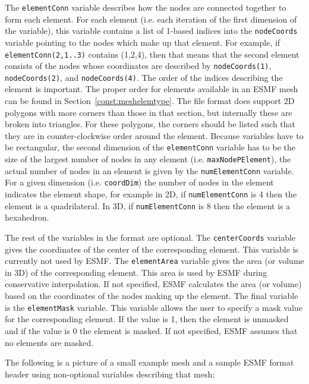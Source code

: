  The {\tt elementConn} variable describes how the nodes are connected together to form each element. For each element (i.e. each iteration of the first
 dimension of the variable), this variable contains a list of 1-based indices into the {\tt nodeCoords} variable pointing to the nodes which make up that
 element. For example, if {\tt elementConn(2,1..3)} contains (1,2,4), then that means that the second element consists of the nodes whose coordinates are
 described by {\tt nodeCoords(1)}, {\tt nodeCoords(2)}, and {\tt nodeCoords(4)}. The order of the indices describing the element is important.
 The proper order for elements available in an ESMF mesh can be found in Section~\ref{const:meshelemtype}. The file format does support 2D polygons with more
 corners than those in that section, but internally these are broken into triangles. For these polygons, the corners should
 be listed such that they are in counter-clockwise order around the element.  Because variables have to be rectangular, the second
 dimension of the {\tt elementConn} variable has to be the size of the largest number of nodes in any element (i.e. {\tt maxNodePElement}), the actual number of
 nodes in an element is given by the {\tt numElementConn} variable. For a given dimension (i.e. {\tt coordDim}) the number of nodes in the element
 indicates the element shape, for example in 2D, if {\tt numElementConn} is 4 then the element is a quadrilateral. In 3D, if {\tt numElementConn} is 8
 then the element is a hexahedron.

 The rest of the variables in the format are optional. The {\tt centerCoords} variable gives the coordinates of the center of the corresponding element.
 This variable is currently not used by ESMF. The {\tt elementArea} variable gives the area (or volume in 3D) of the corresponding element. This
 area is used by ESMF during conservative interpolation. If not specified, ESMF calculates the area (or volume) based on the coordinates of the nodes
 making up the element. The final variable is the {\tt elementMask} variable. This variable allows the user to specify a mask value for
 the corresponding element. If the value is 1, then the element is unmasked and if the value is 0 the element is masked.
 If not specified, ESMF assumes that no elements are masked.

The following is a picture of a small example mesh and a sample ESMF format header using non-optional variables describing that mesh:

